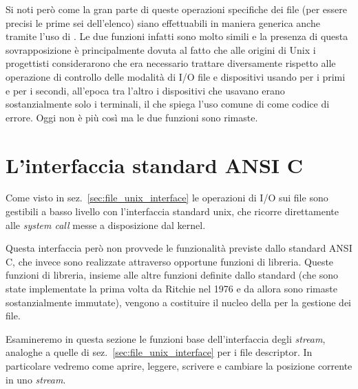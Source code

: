 
Si noti però come la gran parte di queste operazioni specifiche dei file (per
essere precisi le prime sei dell'elenco) siano effettuabili in maniera
generica anche tramite l'uso di . Le due funzioni infatti sono
molto simili e la presenza di questa sovrapposizione è principalmente dovuta
al fatto che alle origini di Unix i progettisti considerarono che era
necessario trattare diversamente rispetto alle operazione di controllo delle
modalità di I/O file e dispositivi usando  per i primi e
 per i secondi, all'epoca tra l'altro i dispositivi che usavano
 erano sostanzialmente solo i terminali, il che spiega l'uso
comune di  come codice di errore. Oggi non è più così ma le
due funzioni sono rimaste.



\section{L'interfaccia standard ANSI C}
\label{sec:files_std_interface}


Come visto in sez.~\ref{sec:file_unix_interface} le operazioni di I/O sui file
sono gestibili a basso livello con l'interfaccia standard unix, che ricorre
direttamente alle \textit{system call} messe a disposizione dal kernel.

Questa interfaccia però non provvede le funzionalità previste dallo standard
ANSI C, che invece sono realizzate attraverso opportune funzioni di libreria.
Queste funzioni di libreria, insieme alle altre funzioni definite dallo
standard (che sono state implementate la prima volta da Ritchie nel 1976 e da
allora sono rimaste sostanzialmente immutate), vengono a costituire il nucleo
della  per la gestione dei file.

Esamineremo in questa sezione le funzioni base dell'interfaccia degli
\textit{stream}, analoghe a quelle di sez.~\ref{sec:file_unix_interface} per i
file descriptor. In particolare vedremo come aprire, leggere, scrivere e
cambiare la posizione corrente in uno \textit{stream}.


